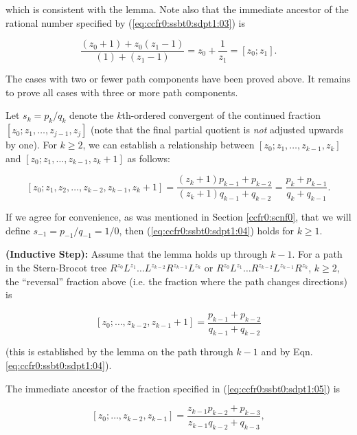 \begin{vworklemmaproof}
\noindent{}which is consistent with the lemma.  Note also that
the immediate ancestor of the rational number specified by
(\ref{eq:ccfr0:ssbt0:sdpt1:03}) is

\begin{equation}
\label{eq:ccfr0:ssbt0:sdpt1:03b}
\frac{(z_0 + 1) + z_0 (z_1 - 1)}{(1) + (z_1 - 1)}
= z_0 + \frac{1}{z_1}
= [z_0; z_1].
\end{equation}

The cases with two or fewer path components have been
proved above.  It remains to prove all cases with three
or more path components.

Let $s_k = p_k/q_k$ denote the $k$th-ordered convergent
of the continued fraction $[z_0; z_1, \ldots{}, z_{j-1}, z_j]$
(note that the final partial quotient is \emph{not} adjusted upwards by one).
For $k \geq 2$, we can establish a relationship between
$[z_0; z_1, \ldots{}, z_{k-1}, z_k]$
and
$[z_0; z_1, \ldots{}, z_{k-1}, z_k + 1]$ 
as follows:

\begin{equation}
\label{eq:ccfr0:ssbt0:sdpt1:04}
[z_0; z_1, z_2, \ldots{}, z_{k-2}, z_{k-1}, z_k + 1]
=
\frac{(z_k + 1)p_{k-1} + p_{k-2}}{(z_k + 1)q_{k-1} + q_{k-2}}
=
\frac{p_k + p_{k-1}}{q_k + q_{k-1}}.
\end{equation}

If we agree for convenience, as was mentioned in
Section \ref{ccfr0:scnf0}, that we will define $s_{-1} = p_{-1}/q_{-1} = 1/0$, 
then (\ref{eq:ccfr0:ssbt0:sdpt1:04}) holds for $k \geq 1$.

\textbf{(Inductive Step):} Assume that the lemma holds
up through $k-1$.  For a path in the Stern-Brocot tree
$R^{z_0}L^{z_1} \ldots{} L^{z_{k-2}} R^{z_{k-1}} L^{z_{k}}$ 
or $R^{z_0}L^{z_1} \ldots{} R^{z_{k-2}} L^{z_{k-1}} R^{z_{k}}$, 
$k \geq 2$, the ``reversal'' fraction above (i.e. the fraction where the path changes
directions) is

\begin{equation}
\label{eq:ccfr0:ssbt0:sdpt1:05}
[z_0; \ldots{}, z_{k-2}, z_{k-1} + 1] = 
\frac{p_{k-1} + p_{k-2}}{q_{k-1} + q_{k-2}}
\end{equation}

\noindent{}(this is established by the lemma on the path through $k-1$ and by
Eqn. \ref{eq:ccfr0:ssbt0:sdpt1:04}).

The immediate ancestor of the fraction specified in 
(\ref{eq:ccfr0:ssbt0:sdpt1:05}) is

\begin{equation}
\label{eq:ccfr0:ssbt0:sdpt1:06}
[z_0; \ldots{}, z_{k-2}, z_{k-1}] = 
\frac{z_{k-1}p_{k-2} + p_{k-3}}{z_{k-1}q_{k-2} + q_{k-3}} ,
\end{equation}


\end{vworklemmaproof}
